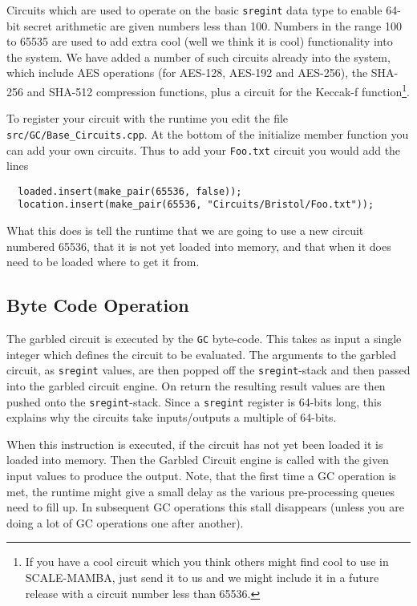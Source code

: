 Circuits which are used to operate on the basic \verb|sregint|
data type to enable 64-bit secret arithmetic are
given numbers less than 100.
Numbers in the range 100 to 65535 are used to add extra
cool (well we think it is cool) functionality into the
system.
We have added a number of such circuits already into the
system, which include AES operations (for AES-128, AES-192
and AES-256), the SHA-256 and SHA-512 compression functions,
plus a circuit for the Keccak-f function\footnote{If
you have a cool circuit which you think others might find
cool to use in SCALE-MAMBA, just send it to us and we
might include it in a future release with a circuit
number less than 65536.}.

To register your circuit with the runtime you edit the
file \verb|src/GC/Base_Circuits.cpp|. At the bottom of
the initialize member function you can add your
own circuits.
Thus to add your \verb|Foo.txt| circuit you would add
the lines
\begin{lstlisting}
  loaded.insert(make_pair(65536, false));
  location.insert(make_pair(65536, "Circuits/Bristol/Foo.txt"));
\end{lstlisting}
What this does is tell the runtime that we are going to
use a new circuit numbered 65536, that it is not yet loaded
into memory, and that when it does need to be loaded
where to get it from.

\subsection{Byte Code Operation}
The garbled circuit is executed by the \verb|GC| byte-code.
This takes as input a single integer which defines the
circuit to be evaluated.
The arguments to the garbled circuit, as \verb|sregint| values,
are then popped off the \verb|sregint|-stack and then passed
into the garbled circuit engine.
On return the resulting result values are then pushed
onto the \verb|sregint|-stack.
Since a \verb|sregint| register is 64-bits long, this
explains why the circuits take inputs/outputs a multiple
of 64-bits.

When this instruction is executed, if the circuit has
not yet been loaded it is loaded into memory. Then the
Garbled Circuit engine is called with the given input
values to produce the output.
Note, that the first time a GC operation is met, the
runtime might give a small delay as the various pre-processing
queues need to fill up.
In subsequent GC operations this stall disappears (unless
you are doing a lot of GC operations one after another).

